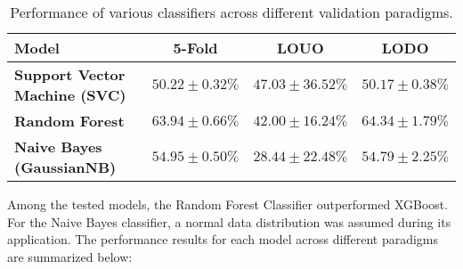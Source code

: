 \documentclass{article}
\begin{document}
\begin{table}[h!]
\centering
\begin{tabular}{|l|c|c|c|}
\hline
\textbf{Model}               & \textbf{5-Fold}             & \textbf{LOUO}               & \textbf{LODO}               \\ \hline
\textbf{Support Vector Machine (SVC)} & $50.22 \pm 0.32\%$  & $47.03 \pm 36.52\%$ & $50.17 \pm 0.38\%$  \\ \hline
\textbf{Random Forest}       & $63.94 \pm 0.66\%$  & $42.00 \pm 16.24\%$ & $64.34 \pm 1.79\%$  \\ \hline
\textbf{Naive Bayes (GaussianNB)} & $54.95 \pm 0.50\%$  & $28.44 \pm 22.48\%$ & $54.79 \pm 2.25\%$  \\ \hline
\end{tabular}
\caption{Performance of various classifiers across different validation paradigms.}
\label{tab:exercise2}
\end{table}

Among the tested models, the Random Forest Classifier outperformed XGBoost. For the Naive Bayes classifier, a normal data distribution was assumed during its application. The performance results for each model across different paradigms are summarized below:
\end{document}
